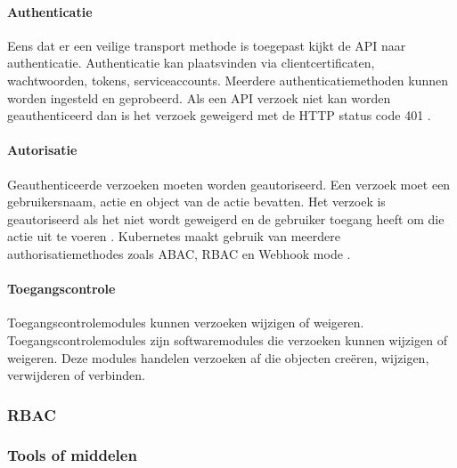 \paragraph{Authenticatie}
Eens dat er een veilige transport methode is toegepast kijkt de API naar authenticatie. Authenticatie kan plaatsvinden via clientcertificaten, wachtwoorden, tokens, serviceaccounts. Meerdere authenticatiemethoden kunnen worden ingesteld en geprobeerd.
Als een API verzoek niet kan worden geauthenticeerd dan is het verzoek geweigerd met de HTTP status code 401 \autocite{KubernetesDocs-2023}.  

\paragraph{Autorisatie}
Geauthenticeerde verzoeken moeten worden geautoriseerd. Een verzoek moet een gebruikersnaam, actie en object van de actie bevatten. Het verzoek is geautoriseerd als het niet wordt geweigerd en de gebruiker toegang heeft om die actie uit te voeren \autocite{KubernetesDocs-2023}.
Kubernetes maakt gebruik van meerdere authorisatiemethodes zoals ABAC, RBAC en Webhook mode \autocite{KubernetesDocs-2023}. 

\paragraph{Toegangscontrole}
Toegangscontrolemodules kunnen verzoeken wijzigen of weigeren. Toegangscontrolemodules zijn softwaremodules die verzoeken kunnen wijzigen of weigeren. Deze modules   handelen verzoeken af die objecten creëren, wijzigen, verwijderen of verbinden. 


\subsubsection{RBAC}


\subsubsection{Tools of middelen}





